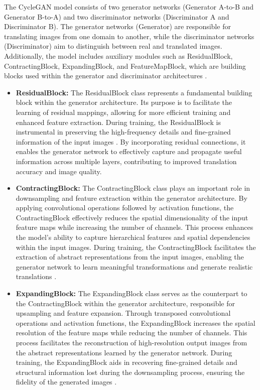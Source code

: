 \documentclass[UKenglish,12pt]{master-style}
\begin{document}
The CycleGAN model consists of two generator networks (Generator A-to-B and Generator B-to-A) and two discriminator networks (Discriminator A and Discriminator B). The generator networks (Generator) are responsible for translating images from one domain to another, while the discriminator networks (Discriminator) aim to distinguish between real and translated images. Additionally, the model includes auxiliary modules such as ResidualBlock, ContractingBlock, ExpandingBlock, and FeatureMapBlock, which are building blocks used within the generator and discriminator architectures \cite{CycleGAN} .
\begin{itemize}
\item \textbf{ResidualBlock:}
The ResidualBlock class represents a fundamental building block within the generator architecture. Its purpose is to facilitate the learning of residual mappings, allowing for more efficient training and enhanced feature extraction. During training, the ResidualBlock is instrumental in preserving the high-frequency details and fine-grained information of the input images \cite{CycleGAN} . By incorporating residual connections, it enables the generator network to effectively capture and propagate useful information across multiple layers, contributing to improved translation accuracy and image quality.

\item \textbf{ContractingBlock:}
The ContractingBlock class plays an important role in downsampling and feature extraction within the generator architecture. By applying convolutional operations followed by activation functions, the ContractingBlock effectively reduces the spatial dimensionality of the input feature maps while increasing the number of channels. This process enhances the model's ability to capture hierarchical features and spatial dependencies within the input images. During training, the ContractingBlock facilitates the extraction of abstract representations from the input images, enabling the generator network to learn meaningful transformations and generate realistic translations \cite{CycleGAN} .

\item \textbf{ExpandingBlock:}
The ExpandingBlock class serves as the counterpart to the ContractingBlock within the generator architecture, responsible for upsampling and feature expansion. Through transposed convolutional operations and activation functions, the ExpandingBlock increases the spatial resolution of the feature maps while reducing the number of channels. This process facilitates the reconstruction of high-resolution output images from the abstract representations learned by the generator network. During training, the ExpandingBlock aids in recovering fine-grained details and structural information lost during the downsampling process, ensuring the fidelity of the generated images \cite{CycleGAN} .


\end{itemize}
\end{document}
